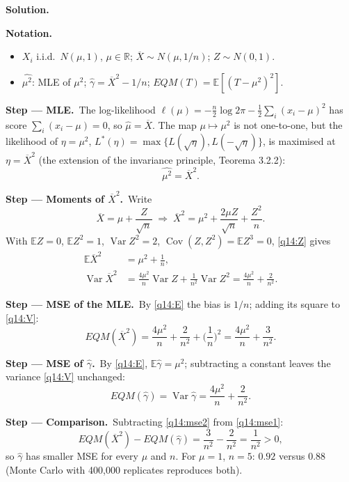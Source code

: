 \documentclass[11pt,a4paper]{article}
\numberwithin{equation}{questao}   %
\newenvironment{notacao}{\par\smallskip\noindent\textbf{Notation.}\begin{itemize}[leftmargin=1.4em,topsep=1pt,itemsep=0pt]\small}{\end{itemize}}
\newcommand{\passo}[2]{\par\smallskip\noindent\textbf{Step --- #1.}~#2}
\newcommand{\solhead}{\par\medskip\noindent{\color{blue!55!black}\rule{\linewidth}{0.3pt}}\par\noindent\textbf{Solution.}}
\newcommand{\E}{\mathbb{E}}
\newcommand{\Var}{\operatorname{Var}}
\newcommand{\Cov}{\operatorname{Cov}}
\begin{document}
\begin{sol}
\solhead
\begin{notacao}
\item $X_i$ i.i.d.\ $N(\mu,1)$, $\mu\in\mathbb R$; $\overline X\sim N(\mu,1/n)$; $Z\sim N(0,1)$.
\item $\widehat{\mu^2}$: MLE of $\mu^2$; $\hat\gamma=\overline X^2-1/n$; $EQM(T)=\E[(T-\mu^2)^2]$.
\end{notacao}

\passo{MLE}{The log-likelihood $\ell(\mu)=-\frac n2\log2\pi-\frac12\sum_i(x_i-\mu)^2$ has score
$\sum_i(x_i-\mu)=0$, so $\hat\mu=\overline X$. The map $\mu\mapsto\mu^2$ is not one-to-one, but the
likelihood of $\eta=\mu^2$, $L^*(\eta)=\max\{L(\sqrt\eta),L(-\sqrt\eta)\}$, is maximised at
$\eta=\overline X^2$ (the extension of the invariance principle, Teorema 3.2.2):}
\begin{equation}\label{q14:mle}
\widehat{\mu^2}=\overline X^2 .
\end{equation}

\passo{Moments of $\overline X^2$}{Write}
\begin{equation}\label{q14:Z}
\overline X=\mu+\frac{Z}{\sqrt n}\;\Longrightarrow\;\overline X^2=\mu^2+\frac{2\mu Z}{\sqrt n}+\frac{Z^2}{n}.
\end{equation}
With $\E Z=0$, $\E Z^2=1$, $\Var Z^2=2$, $\Cov(Z,Z^2)=\E Z^3=0$, \eqref{q14:Z} gives
\begin{align}
\E\overline X^2&=\mu^2+\frac1n, \label{q14:E}\\
\Var\overline X^2&=\frac{4\mu^2}{n}\Var Z+\frac{1}{n^2}\Var Z^2=\frac{4\mu^2}{n}+\frac{2}{n^2}. \label{q14:V}
\end{align}

\passo{MSE of the MLE}{By \eqref{q14:E} the bias is $1/n$; adding its square to \eqref{q14:V}:}
\begin{equation}\label{q14:mse1}
EQM(\overline X^2)=\frac{4\mu^2}{n}+\frac{2}{n^2}+\Big(\frac1n\Big)^2=\frac{4\mu^2}{n}+\frac{3}{n^2}.
\end{equation}

\passo{MSE of $\hat\gamma$}{By \eqref{q14:E}, $\E\hat\gamma=\mu^2$; subtracting a constant leaves the
variance \eqref{q14:V} unchanged:}
\begin{equation}\label{q14:mse2}
EQM(\hat\gamma)=\Var\hat\gamma=\frac{4\mu^2}{n}+\frac{2}{n^2}.
\end{equation}

\passo{Comparison}{Subtracting \eqref{q14:mse2} from \eqref{q14:mse1}:}
\[
EQM(\overline X^2)-EQM(\hat\gamma)=\frac{3}{n^2}-\frac{2}{n^2}=\frac1{n^2}>0 ,
\]
so $\hat\gamma$ has smaller MSE for every $\mu$ and $n$. For $\mu=1$, $n=5$: $0.92$ versus $0.88$
(Monte Carlo with 400{,}000 replicates reproduces both).


\end{sol}
\end{document}
